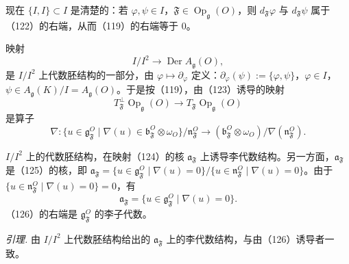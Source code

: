 现在 $\{I,I\}\subset I$ 是清楚的：若 $\varphi,\psi\in I$，$\mathfrak{F}\in\operatorname{Op}_{\mathfrak{g}}(O)$，则 $d_{\mathfrak{F}}\varphi$ 与 $d_{\mathfrak{F}}\psi$ 属于（122）的右端，从而（119）的右端等于 0。


映射
\begin{equation}\tag{123}
I/I^2\to\operatorname{Der}A_{\mathfrak{g}}(O),
\end{equation}
是 $I/I^2$ 上代数胚结构的一部分，由 $\varphi\mapsto\partial_\varphi$ 定义：$\partial_\varphi(\psi):=\{\varphi,\psi\}$，$\varphi\in I$，$\psi\in A_{\mathfrak{g}}(K)/I=A_{\mathfrak{g}}(O)$。于是按（119），由（123）诱导的映射
\begin{equation}\tag{124}
T^{\perp}_{\mathfrak{F}}\operatorname{Op}_{\mathfrak{g}}(O)\to T_{\mathfrak{F}}\operatorname{Op}_{\mathfrak{g}}(O)
\end{equation}
是算子
\begin{equation}\tag{125}
\nabla:\{u\in\mathfrak{g}^O_{\mathfrak{F}}\mid\nabla(u)\in\mathfrak{b}^O_{\mathfrak{F}}\otimes\omega_O\}/\mathfrak{n}^O_{\mathfrak{F}}\to(\mathfrak{b}^O_{\mathfrak{F}}\otimes\omega_O)/\nabla(\mathfrak{n}^O_{\mathfrak{F}}).
\end{equation}

$I/I^2$ 上的代数胚结构，在映射（124）的核 $\mathfrak{a}_{\mathfrak{F}}$ 上诱导李代数结构。另一方面，$\mathfrak{a}_{\mathfrak{F}}$ 是（125）的核，即 $\mathfrak{a}_{\mathfrak{F}}=\{u\in\mathfrak{g}^O_{\mathfrak{F}}\mid\nabla(u)=0\}/\{u\in\mathfrak{n}^O_{\mathfrak{F}}\mid\nabla(u)=0\}$。由于 $\{u\in\mathfrak{n}^O_{\mathfrak{F}}\mid\nabla(u)=0\}=0$，有
\begin{equation}\tag{126}
\mathfrak{a}_{\mathfrak{F}}=\{u\in\mathfrak{g}^O_{\mathfrak{F}}\mid\nabla(u)=0\}.
\end{equation}
（126）的右端是 $\mathfrak{g}^O_{\mathfrak{F}}$ 的李子代数。

\emph{引理.} 由 $I/I^2$ 上代数胚结构给出的 $\mathfrak{a}_{\mathfrak{F}}$ 上的李代数结构，与由（126）诱导者一致。

